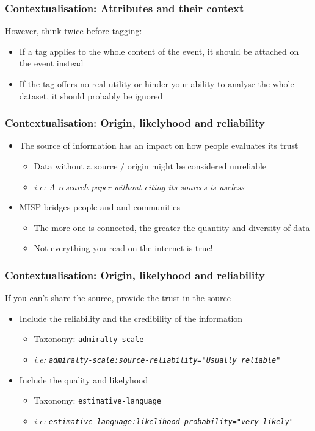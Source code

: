 \begin{frame}
    \frametitle{Contextualisation: Attributes and their context}
    However, think twice before tagging:
    \begin{itemize}
        \item If a tag applies to the whole content of the event, it should be attached on the event instead
        \item If the tag offers no real utility or hinder your ability to analyse the whole dataset, it should probably be ignored
    \end{itemize}
\end{frame}

\begin{frame}
    \frametitle{Contextualisation: Origin, likelyhood and reliability}
    \begin{itemize}
        \item The source of information has an impact on how people evaluates its trust
        \begin{itemize}
            \item Data without a source / origin might be considered unreliable
            \item \textit{i.e: A research paper without citing its sources is useless}
        \end{itemize}
        \item MISP bridges people and and communities
        \begin{itemize}
            \item The more one is connected, the greater the quantity and diversity of data
            \item Not everything you read on the internet is true!
        \end{itemize}
    \end{itemize}
\end{frame}

\begin{frame}
    \frametitle{Contextualisation: Origin, likelyhood and reliability}
    If you can't share the source, provide the trust in the source
    \begin{itemize}
        \item Include the reliability and the credibility of the information
            \begin{itemize}
                \item Taxonomy: \texttt{admiralty-scale}
                \item \textit{i.e: \texttt{admiralty-scale:source-reliability="Usually reliable"}}
            \end{itemize}
        \item Include the quality and likelyhood
            \begin{itemize}
                \item Taxonomy: \texttt{estimative-language}
                \item \textit{i.e: \texttt{estimative-language:likelihood-probability="very likely"}}
            \end{itemize}
    \end{itemize}
\end{frame}

